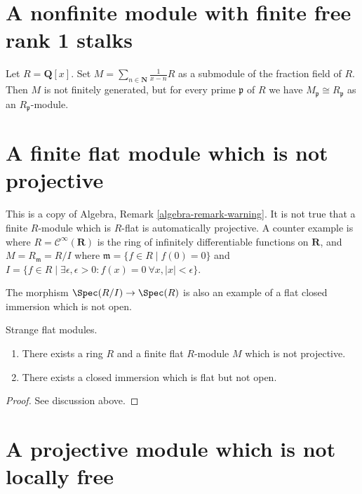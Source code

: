 \section{A nonfinite module with finite free rank 1 stalks}
\label{section-nonfree}

\noindent
Let $R = \mathbf{Q}[x]$. Set
$M = \sum_{n \in \mathbf{N}} \frac{1}{x - n}R$ as a submodule of
the fraction field of $R$. Then $M$ is not finitely generated, but
for every prime $\mathfrak p$ of $R$ we have
$M_{\mathfrak p} \cong R_{\mathfrak p}$ as an
$R_{\mathfrak p}$-module.




\section{A finite flat module which is not projective}
\label{section-finite-flat-not-projective}

\noindent
This is a copy of
Algebra, Remark \ref{algebra-remark-warning}.
It is not true that a finite $R$-module which is
$R$-flat is automatically projective. A counter
example is where $R = \mathcal{C}^\infty(\mathbf{R})$
is the ring of infinitely differentiable functions on
$\mathbf{R}$, and $M = R_{\mathfrak m} = R/I$ where
$\mathfrak m = \{f \in R \mid f(0) = 0\}$ and
$I = \{f \in R \mid \exists \epsilon, \epsilon > 0 :
f(x) = 0\ \forall x, |x| < \epsilon\}$.

\medskip\noindent
The morphism $\Spec(R/I) \to \Spec(R)$ is also
an example of a flat closed immersion which is not open.

\begin{lemma}
\label{lemma-finite-flat-non-projective}
Strange flat modules.
\begin{enumerate}
\item There exists a ring $R$ and a finite flat $R$-module $M$ which is
not projective.
\item There exists a closed immersion which is flat but not open.
\end{enumerate}
\end{lemma}

\begin{proof}
See discussion above.
\end{proof}



\section{A projective module which is not locally free}
\label{section-projective-not-locally-free}

